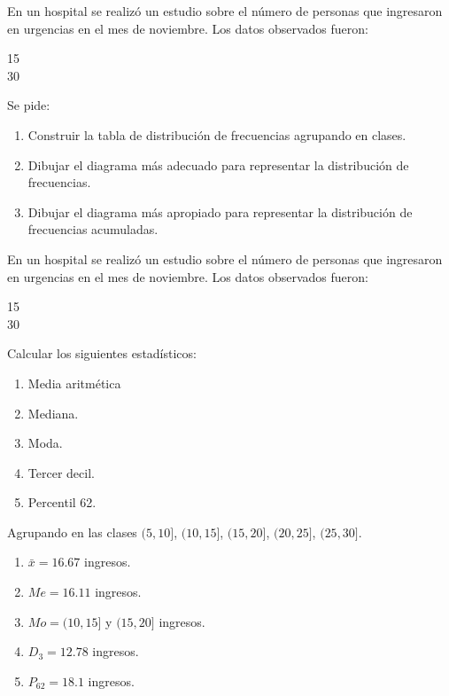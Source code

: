 {En un hospital se realizó un estudio sobre el número de personas que ingresaron en urgencias en el mes de noviembre. Los datos observados fueron:
\begin{center}
15               \\
30              
\end{center}
Se pide:
\begin{enumerate}
\item Construir la tabla de distribución de frecuencias agrupando en clases. 
\item Dibujar el diagrama más adecuado para representar la distribución de frecuencias. 
\item Dibujar el diagrama más apropiado para representar la distribución de frecuencias acumuladas.
\end{enumerate}
}
{
}
{}


{En un hospital se realizó un estudio sobre el número de personas que ingresaron en urgencias en el mes de noviembre. Los datos observados fueron:
\begin{center}
15               \\
30              
\end{center}
Calcular los siguientes estadísticos:
\begin{enumerate}
\item Media aritmética
\item Mediana.
\item Moda.
\item Tercer decil.
\item Percentil 62.
\end{enumerate}
}
{
Agrupando en las clases $(5,10]$, $(10,15]$, $(15,20]$, $(20,25]$, $(25,30]$.
\begin{enumerate}
\item $\bar{x} = 16.67$ ingresos.
\item $Me=16.11$ ingresos.
\item $Mo=(10,15]$ y $(15,20]$ ingresos.
\item $D_3=12.78$ ingresos.
\item $P_{62}=18.1$ ingresos.
\end{enumerate}
}
{}



